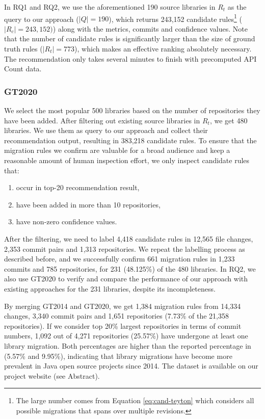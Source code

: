 \documentclass[conference, 10pt]{IEEEtran}
\begin{document}
In RQ1 and RQ2, we use the aforementioned 190 source libraries in $R_t$ as the query to our approach ($|Q|=190$), which returns 243,152 candidate rules\footnote{The large number comes from Equation \ref{eq:cand-teyton} which considers all possible migrations that spans over multiple revisions.} ($|R_c|=243,152)$) along with the metrics, commits and confidence values. Note that the number of candidate rules is significantly larger than the size of ground truth rules ($|R_t|=773$), which makes an effective ranking absolutely necessary. The recommendation only takes several minutes to finish with precomputed API Count data.

\subsubsection{GT2020}

We select the most popular 500 libraries based on the number of repositories they have been added. After filtering out existing source libraries in $R_t$, we get 480 libraries.
We use them as query to our approach and collect their recommendation output, resulting in 383,218 candidate rules. 
To ensure that the migration rules we confirm are valuable for a broad audience and keep a reasonable amount of human inspection effort, we only inspect candidate rules that:
\begin{enumerate}
    \item occur in top-20 recommendation result,
    \item have been added in more than 10 repositories,
    \item have non-zero confidence values.
\end{enumerate}
After the filtering, we need to label 4,418 candidate rules in 12,565  file changes, 2,353 commit pairs and 1,313 repositories. 
We repeat the labelling process as described before, and we successfully confirm 661 migration rules in 1,233 commits and 785 repositories, for 231 (48.125\%) of the 480 libraries. 
In RQ2, we also use GT2020 to verify and compare the performance of our approach with existing approaches for the 231 libraries, despite its incompleteness.


By merging GT2014 and GT2020, we get 1,384 migration rules from 14,334  changes, 3,340 commit pairs and 1,651 repositories (7.73\% of the 21,358 repositories). 
If we consider top 20\% largest repositories in terms of commit numbers, 1,092 out of 4,271 repositories (25.57\%) have undergone at least one library migration.
Both percentages are higher than the reported percentage in \cite{2014JournalOfSysAndSoft-Teyton-Study} (5.57\% and 9.95\%), indicating that library migrations have become more prevalent in Java open source projects since 2014. The dataset is available on our project website (see Abstract).
\end{document}
